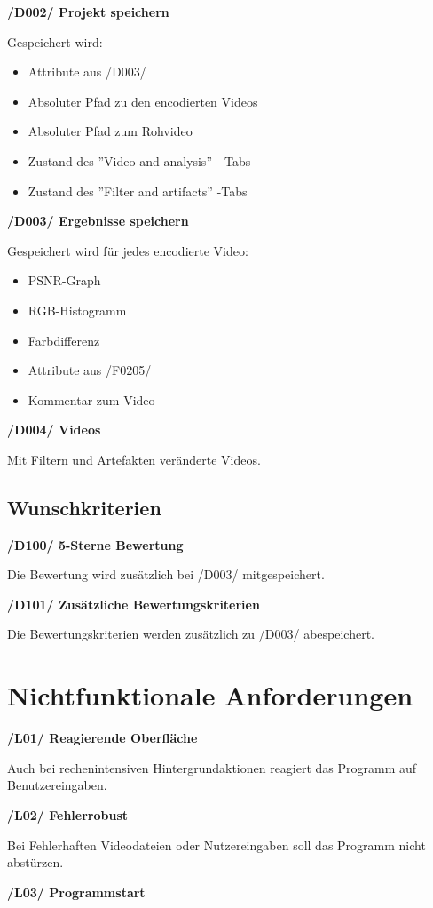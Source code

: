 \documentclass[parskip=full]{scrartcl}
\begin{document}
\textbf{/D002/ Projekt speichern}

Gespeichert wird:
\begin{itemize}
\item Attribute aus /D003/
\item Absoluter Pfad zu den encodierten Videos
\item Absoluter Pfad zum Rohvideo
\item Zustand des ''Video and analysis'' - Tabs
\item Zustand des ''Filter and artifacts'' -Tabs
\end{itemize}

\textbf{/D003/ Ergebnisse speichern}

Gespeichert wird für jedes encodierte Video:
\begin{itemize}
\item PSNR-Graph
\item RGB-Histogramm
\item Farbdifferenz
\item Attribute aus /F0205/
\item Kommentar zum Video
\end{itemize}

\textbf{/D004/ Videos}

Mit Filtern und Artefakten veränderte Videos.

\subsection{Wunschkriterien}
\textbf{/D100/ 5-Sterne Bewertung}

Die Bewertung wird zusätzlich bei /D003/ mitgespeichert.

\textbf{/D101/ Zusätzliche Bewertungskriterien}

Die Bewertungskriterien werden zusätzlich zu /D003/ abespeichert.


\newpage
\section{Nichtfunktionale Anforderungen}
\textbf{/L01/ Reagierende Oberfläche}

Auch bei rechenintensiven Hintergrundaktionen reagiert das Programm auf Benutzereingaben.

\textbf{/L02/ Fehlerrobust}

Bei Fehlerhaften Videodateien oder Nutzereingaben soll das Programm nicht abstürzen.

\textbf{/L03/ Programmstart}
\end{document}

